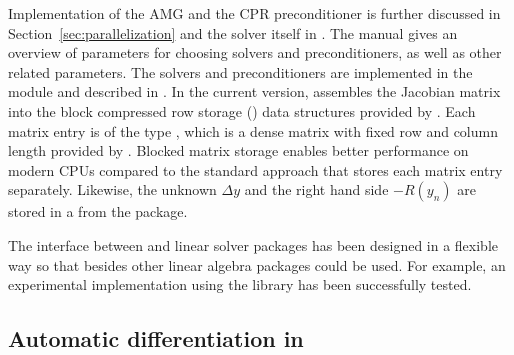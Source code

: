Implementation of the AMG and the CPR preconditioner 
is further discussed in Section~\ref{sec:parallelization} and the solver itself
in \cite{blattamg}. The \opmflow manual \citep{flowmanual} gives an overview of
parameters for choosing solvers and preconditioners, as well as other related parameters.
The solvers and preconditioners are implemented in the \dune module \duneistl 
and described in \cite{ISTL,ISTLParallel}.
In the current version, \opmflow assembles the Jacobian matrix into the 
block compressed row storage () 
data structures provided by \duneistl. Each matrix entry is of the type 
, which is a dense matrix with fixed row and column length provided by \dunecommon.
Blocked matrix storage enables better performance on modern
CPUs compared to the standard approach that stores each matrix entry separately. 
Likewise, the unknown $\Delta y$ and the right hand side $-R(y_n)$ are stored in a
 from the \duneistl package.

The interface between \opmflow and linear solver packages has been designed in a
flexible way so that besides \duneistl other linear algebra packages could be used. 
For example, an experimental implementation using the \petsc library \cite{petsc-user-ref} 
has been successfully tested.
{}



\subsection{Automatic differentiation in \opmflow}

